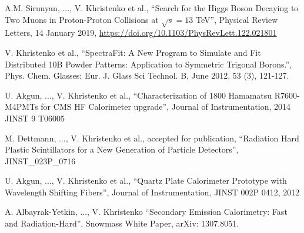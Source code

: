 \documentclass[10pt, letterpaper]{deps1}
\begin{document}
\small{\begin{tightitemize}
    \item A.M. Sirunyan, ..., V. Khristenko et al., ``Search for the Higgs Boson Decaying to Two Muons in Proton-Proton Collisions at $\sqrt{s}=13$ TeV'', Physical Review Letters, 14 January 2019, \url{https://doi.org/10.1103/PhysRevLett.122.021801}
    \item V. Khristenko et al., ``SpectraFit: A New Program to Simulate and Fit Distributed 10B Powder Patterns: Application to Symmetric Trigonal Borons.'', Phys. Chem. Glasses: Eur. J. Glass Sci Technol. B, June 2012, 53 (3), 121-127.
    \item U. Akgun, ..., V. Khristenko et al., ``Characterization of 1800 Hamamatsu R7600-M4PMTs for CMS HF Calorimeter upgrade'', Journal of Instrumentation, 2014 JINST 9 T06005
    \item M. Dettmann, ..., V. Khristenko et al., accepted for publication, ``Radiation Hard Plastic Scintillators for a New Generation of Particle Detectors'', JINST\_023P\_0716
    \item U. Akgun, ..., V. Khristenko et al., ``Quartz Plate Calorimeter Prototype with Wavelength Shifting Fibers'', Journal of Instrumentation, JINST 002P 0412, 2012
    \item A. Albayrak-Yetkin, ..., V. Khristenko ``Secondary Emission Calorimetry: Fast and Radiation-Hard'', Snowmass White Paper, arXiv: 1307.8051.
\end{tightitemize}}
\end{document}

